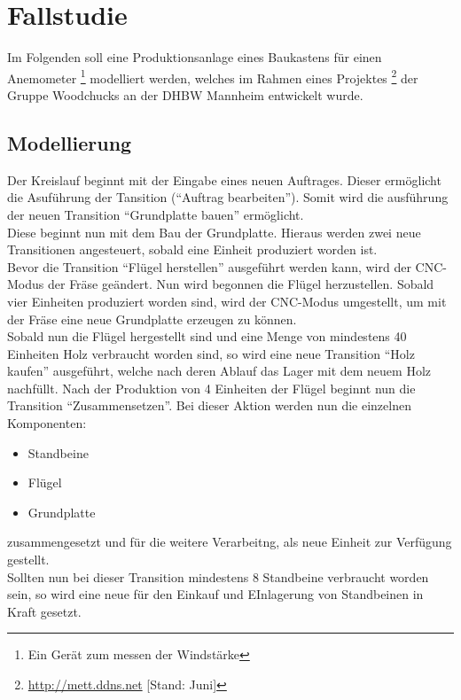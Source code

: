 \chapter{Fallstudie}
Im Folgenden soll eine Produktionsanlage eines Baukastens für einen
Anemometer \footnote{Ein Gerät zum messen der Windstärke} modelliert werden, welches im Rahmen eines Projektes \footnote{\url{http://mett.ddns.net} [Stand: Juni]}  der Gruppe Woodchucks an der DHBW Mannheim entwickelt wurde.
\section{Modellierung}
Der Kreislauf beginnt mit der Eingabe eines neuen Auftrages. Dieser ermöglicht die Asuführung der Tansition ("`Auftrag bearbeiten"').
Somit wird die ausführung der neuen Transition "`Grundplatte bauen"' ermöglicht. \\ Diese beginnt nun mit dem Bau der Grundplatte. Hieraus werden zwei neue Transitionen angesteuert, sobald eine Einheit produziert worden ist. \\ Bevor die Transition "`Flügel herstellen"' ausgeführt werden kann, wird der CNC-Modus der Fräse geändert.  Nun wird begonnen die Flügel herzustellen. Sobald vier Einheiten produziert worden sind, wird der CNC-Modus umgestellt, um mit der Fräse eine neue Grundplatte erzeugen zu können. \\ Sobald nun die Flügel hergestellt sind und eine Menge von mindestens 40 Einheiten Holz verbraucht worden sind, so wird eine neue Transition "`Holz kaufen"' ausgeführt, welche nach deren Ablauf das Lager mit dem neuem Holz nachfüllt. Nach der Produktion von 4 Einheiten der Flügel beginnt nun die Transition "`Zusammensetzen"'. Bei dieser Aktion werden nun die einzelnen Komponenten: \begin{itemize}
	\itemsep0pt
	\item Standbeine
	\item Flügel
	\item Grundplatte
\end{itemize} zusammengesetzt und für die weitere Verarbeitng, als neue Einheit zur Verfügung gestellt. \\ Sollten nun bei dieser Transition mindestens 8 Standbeine verbraucht worden sein, so wird eine neue für den Einkauf und EInlagerung von Standbeinen in Kraft gesetzt.
